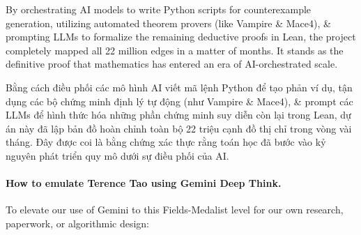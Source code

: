 \documentclass{article}
\begin{document}
\begin{enumerate}
	By orchestrating AI models to write Python scripts for counterexample generation, utilizing automated theorem provers (like Vampire \& Mace4), \& prompting LLMs to formalize the remaining deductive proofs in Lean, the project completely mapped all 22 million edges in a matter of months. It stands as the definitive proof that mathematics has entered an era of AI-orchestrated scale.
	
	Bằng cách điều phối các mô hình AI viết mã lệnh Python để tạo phản ví dụ, tận dụng các bộ chứng minh định lý tự động (như Vampire \& Mace4), \& prompt các LLMs để hình thức hóa những phần chứng minh suy diễn còn lại trong Lean, dự án này đã lập bản đồ hoàn chỉnh toàn bộ 22 triệu cạnh đồ thị chỉ trong vòng vài tháng. Đây được coi là bằng chứng xác thực rằng toán học đã bước vào kỷ nguyên phát triển quy mô dưới sự điều phối của AI.
\end{enumerate}

\paragraph{How to emulate {\sc Terence Tao} using Gemini Deep Think.} To elevate our use of Gemini to this Fields-Medalist level for our own research, paperwork, or algorithmic design:
\end{document}
